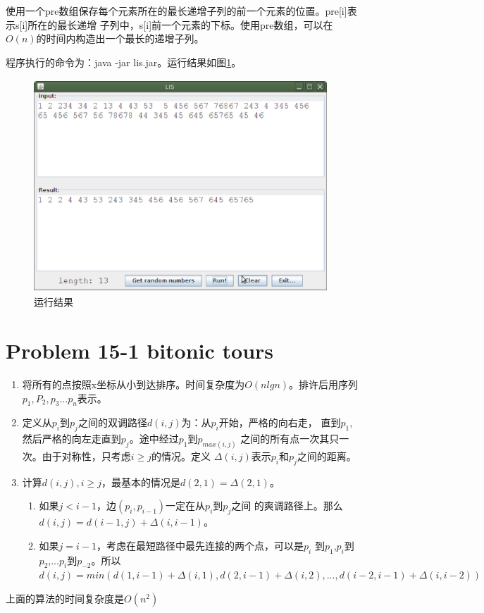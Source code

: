 \documentclass[a4paper, 11pt]{article}
\begin{document}
使用一个pre数组保存每个元素所在的最长递增子列的前一个元素的位置。pre[i]表示s[i]所在的最长递增
子列中，s[i]前一个元素的下标。使用pre数组，可以在$O(n)$的时间内构造出一个最长的递增子列。

程序执行的命令为：java -jar lis.jar。运行结果如图\ref{result}。

\begin{figure}[htbp]
\centering
\caption{运行结果}
\label{result}
\includegraphics[height=8cm, width=11cm]{LIS.eps}
\end{figure}

\section{Problem 15-1 bitonic tours}

\begin{enumerate}
	\item 将所有的点按照x坐标从小到达排序。时间复杂度为$O(nlgn)$。排许后用序列
		$p_1, P_2, p_3 ... p_n$表示。
	\item 定义从$p_i$到$p_j$之间的双调路径$d(i,j)$为：从$p_i$开始，严格的向右走，
		直到$p_1$,然后严格的向左走直到$p_j$。途中经过$p_1$到$p_{max(i,j)}$
		之间的所有点一次其只一次。由于对称性，只考虑$i \ge j$的情况。定义
		$\Delta(i,j)$表示$p_i$和$p_j$之间的距离。
	\item 计算$d(i,j), i \ge j$，最基本的情况是$d(2,1)=\Delta(2,1)$。
		\begin{enumerate}
			\item 如果$j < i-1$，边$(p_i, p_{i-1})$一定在从$p_i$到$p_j$之间
				的爽调路径上。那么$d(i,j)=d(i-1,j)+\Delta(i, i-1)$。
			\item 如果$j = i-1$，考虑在最短路径中最先连接的两个点，可以是$p_i$
				到$p_1$,$p_i$到$p_2$,...$p_i$到$p_{-2}$。所以
$d(i,j)=min(d(1,i-1)+\Delta(i,1),d(2,i-1)+\Delta(i,2),...,d(i-2,i-1)+\Delta(i,i-2))$
		\end{enumerate}
\end{enumerate}
	上面的算法的时间复杂度是$O(n^2)$
\end{document}
